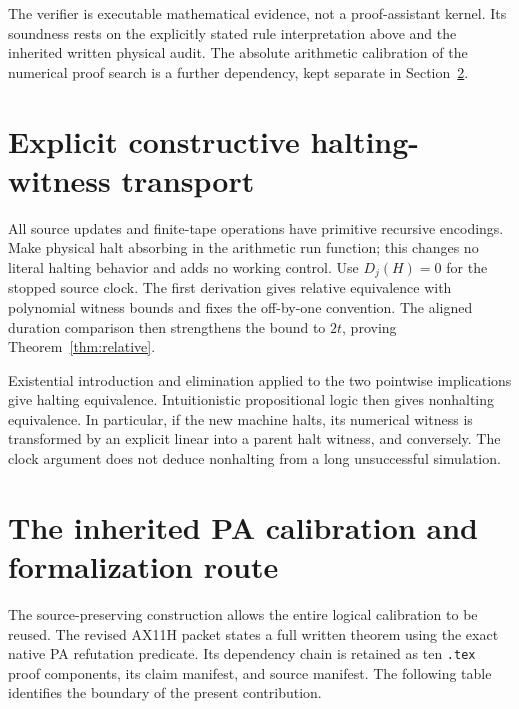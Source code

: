 \documentclass[10pt,a4paper]{article}
\theoremstyle{definition}
\begin{document}
The verifier is executable mathematical evidence, not a proof-assistant
kernel. Its soundness rests on the explicitly stated rule interpretation
above and the inherited written physical audit. The absolute arithmetic
calibration of the numerical proof search is a further dependency, kept
separate in Section~\ref{sec:calibration}.

\section{Explicit constructive halting-witness transport}
\label{sec:clocks}

All source updates and finite-tape operations have primitive recursive
encodings. Make physical halt absorbing in the arithmetic run function;
this changes no literal halting behavior and adds no working control.
Use $D_j(H)=0$ for the stopped source clock. The first derivation gives
relative equivalence with polynomial witness bounds and fixes the
off-by-one convention. The aligned duration comparison then strengthens
the bound to $2t$, proving Theorem~\ref{thm:relative}.





Existential introduction and elimination applied to the two pointwise
implications give halting equivalence. Intuitionistic propositional logic
then gives nonhalting equivalence. In particular, if the new machine
halts, its numerical witness is transformed by an explicit linear
into a parent halt witness, and conversely. The clock argument does not
deduce nonhalting from a long unsuccessful simulation.

\section{The inherited PA calibration and formalization route}
\label{sec:calibration}

The source-preserving construction allows the entire logical calibration
to be reused. The revised AX11H packet states a full written theorem
using the exact native PA refutation predicate. Its dependency chain is
retained as ten \texttt{.tex} proof components, its claim manifest, and
source manifest. The following table identifies the boundary of the
present contribution.
\end{document}
